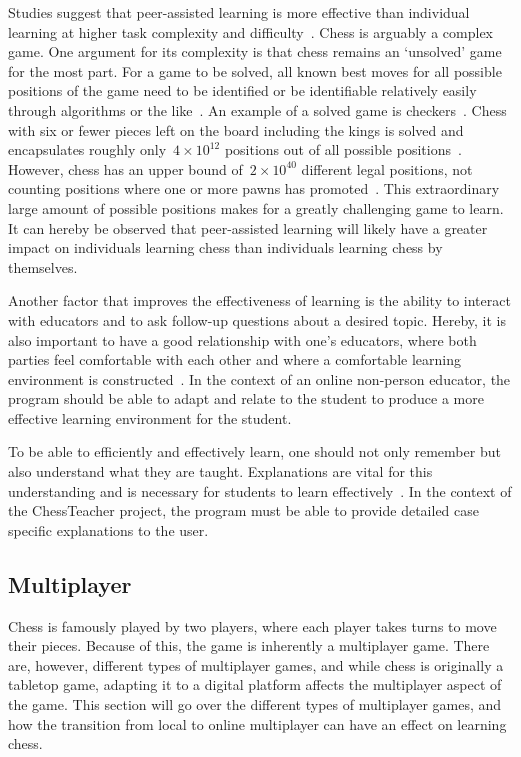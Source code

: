 Studies suggest that peer-assisted learning is more effective than individual learning at higher task complexity and
difficulty~\cite{carson2023}.
Chess is arguably a complex game.
One argument for its complexity is that chess remains an `unsolved' game for the most part.
For a game to be solved, all known best moves for all possible positions of the game need to be identified or be
identifiable relatively easily through algorithms or the like~\cite{herik2002}.
An example of a solved game is checkers~\cite{schaeffer2007}.
Chess with six or fewer pieces left on the board including the kings is solved and encapsulates roughly
only~\( 4 \times 10^{12} \) positions out of all possible positions~\cite{syzygy2024}.
However, chess has an upper bound of~\( 2 \times 10^{40} \) different legal positions, not counting positions where one
or more pawns has promoted~\cite{steinerberger2014}.
This extraordinary large amount of possible positions makes for a greatly challenging game to learn.
It can hereby be observed that peer-assisted learning will likely have a greater impact on individuals learning chess
than individuals learning chess by themselves.

Another factor that improves the effectiveness of learning is the ability to interact with educators and to ask
follow-up questions about a desired topic.
Hereby, it is also important to have a good relationship with one's educators, where both parties feel comfortable with
each other and where a comfortable learning environment is constructed~\cite{saha2009}.
In the context of an online non-person educator, the program should be able to adapt and relate to the student to
produce a more effective learning environment for the student.

To be able to efficiently and effectively learn, one should not only remember but also understand what they are taught.
Explanations are vital for this understanding and is necessary for students to learn effectively~\cite{williams2010}.
In the context of the ChessTeacher project, the program must be able to provide detailed case specific explanations to
the user.

\subsection{Multiplayer}\label{subsec:multiplayer}

Chess is famously played by two players, where each player takes turns to move their pieces.
Because of this, the game is inherently a multiplayer game.
There are, however, different types of multiplayer games, and while chess is originally a tabletop game, adapting it to
a digital platform affects the multiplayer aspect of the game.
This section will go over the different types of multiplayer games, and how the transition from local to online
multiplayer can have an effect on learning chess.

